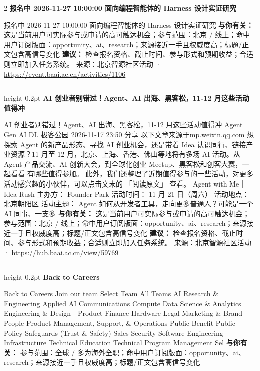 \documentclass[10.5pt]{ctexart}
\begin{document}
\begin{multicols}{2}
{\large\bfseries 报名中 2026-11-27 10:00:00 面向编程智能体的 Harness 设计实证研究}\par
报名中 2026-11-27 10:00:00 面向编程智能体的 Harness 设计实证研究
\textbf{与你有关：} 这是当前用户可实际参与或申请的高可触达机会；参与范围：北京 / 线上；命中用户订阅版面：opportunity、ai、research；来源接近一手且权威度高；标题/正文包含高信号变化
\textbf{建议：} 检查报名资格、截止时间、参与形式和预期收益；合适则立即加入任务系统。
{\footnotesize\color{ormuted} 来源：北京智源社区活动 · \url{https://event.baai.ac.cn/activities/1106}}
\vspace{2mm}
\hrule height 0.2pt
\vspace{2mm}
{\large\bfseries AI 创业者别错过！Agent、AI 出海、黑客松，11-12 月这些活动值得冲}\par
AI 创业者别错过！Agent、AI 出海、黑客松，11-12 月这些活动值得冲 Agent Gen AI DL 极客公园 2026-11-17 23:50 分享 以下文章来源于mp.weixin.qq.com 想探索 Agent 的新产品形态、寻找 AI 创业机会，还是带着 Idea 认识同行、链接产业资源？11 月至 12 月，北京、上海、香港、佛山等地将有多场 AI 活动。从 Agent 产品交流、AI 创新大会，到全球化创业 Meetup、黑客松和创客大赛，一起看看 有哪些值得参加。 此外，我们还整理了近期值得参与的一些活动，对更多活动感兴趣的小伙伴，可以点击文末的 「阅读原文」 查看。 Agent with Me｜Idea Rush 主办方： Founder Park 活动时间： 11 月 21 日（周六） 活动地点： 北京朝阳区 活动主题： Agent 如何从开发者工具，走向更多普通人？可能是一个 AI 同事、一支多
\textbf{与你有关：} 这是当前用户可实际参与或申请的高可触达机会；参与范围：北京 / 线上；命中用户订阅版面：opportunity、ai、research；来源接近一手且权威度高；标题/正文包含高信号变化
\textbf{建议：} 检查报名资格、截止时间、参与形式和预期收益；合适则立即加入任务系统。
{\footnotesize\color{ormuted} 来源：北京智源社区活动 · \url{https://hub.baai.ac.cn/view/59769}}
\vspace{2mm}
\hrule height 0.2pt
\vspace{2mm}
{\large\bfseries Back to Careers}\par
Back to Careers Join our team Select Team All Teams AI Research \& Engineering Applied AI Communications Compute Data Science \& Analytics Engineering \& Design - Product Finance Hardware Legal Marketing \& Brand People Product Management, Support, \& Operations Public Benefit Public Policy Safeguards (Trust \& Safety) Sales Security Software Engineering - Infrastructure Technical Education Technical Program Management Sel
\textbf{与你有关：} 参与范围：全球 / 多为海外全职；命中用户订阅版面：opportunity、ai、research；来源接近一手且权威度高；标题/正文包含高信号变化

\end{multicols}
\end{document}
